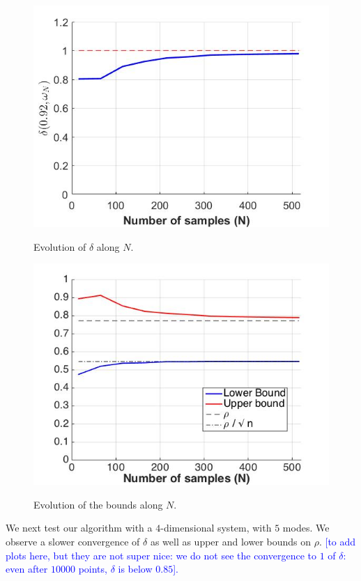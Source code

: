 \begin{figure}
\begin{center}
\includegraphics[scale=0.35]{delta1.jpg}
\label{fig:1}
\caption{Evolution of $\delta$ along $N$.}
\end{center}
\end{figure}
\begin{figure}
\begin{center}
\includegraphics[scale=0.35]{bounds1.jpg}
\label{fig:2}
\caption{Evolution of the bounds along $N$.}
\end{center}
\end{figure}

We next test our algorithm with a $4$-dimensional system, with $5$ modes. We observe a slower convergence of $\delta$ as well as upper and lower bounds on $\rho$.
\textcolor{blue}{[to add plots here, but they are not super nice: we do not see the convergence to $1$ of $\delta$: even after $10 000$ points, $\delta$ is below $0.85$].}

